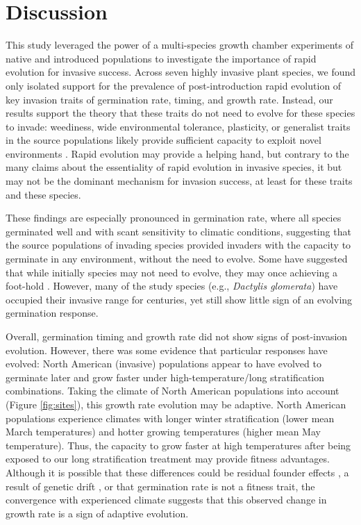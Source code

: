 \documentclass[12pt]{article}\usepackage[]{graphicx}\usepackage[]{color}
\begin{document}
	\section{Discussion}
	
	This study leveraged the power of a multi-species growth chamber experiments of native and introduced populations to investigate the importance of rapid evolution for invasive success. Across seven highly invasive plant species, we found only isolated support for the prevalence of post-introduction rapid evolution of key invasion traits of germination rate, timing, and growth rate. Instead, our results support the theory that these traits do not need to evolve for these species to invade: weediness, wide environmental tolerance, plasticity, or generalist traits in the source populations likely provide sufficient capacity to exploit novel environments \parencite{Baker1965}. Rapid evolution may provide a helping hand, but contrary to the many claims about the essentiality of rapid evolution in invasive species, it but may not be the dominant mechanism for invasion success, at least for these traits and these species. 
	
	These findings are  especially pronounced in germination rate, where all species germinated well and with scant sensitivity to climatic conditions, suggesting that the source populations of invading species provided invaders with the capacity to germinate in any environment, without the need to evolve. Some have suggested that while initially species may not need to evolve, they may once achieving a foot-hold \parencite{Lamarque2015}. However, many of the study species (e.g., \textit{Dactylis glomerata}) have occupied their invasive range for centuries, yet still show little sign of an evolving germination response. 
	
	Overall, germination timing and growth rate did not show signs of post-invasion evolution. However, there was some evidence that particular responses have evolved: North American (invasive) populations appear to have evolved to germinate later and grow faster under high-temperature/long stratification combinations. Taking the climate of North American populations into account (Figure \ref{fig:sites}), this growth rate evolution may be adaptive. North American populations experience climates with longer winter stratification  (lower mean March temperatures) and hotter growing temperatures (higher mean May temperature). Thus, the capacity to grow faster at high temperatures after being exposed to our long stratification treatment may provide fitness advantages. Although it is  possible that these differences could be residual founder effects \parencite{Shirk2014}, a result of genetic drift \parencite{Eckert1996}, or that germination rate is not a fitness trait,  the convergence with experienced climate suggests that this observed change in growth rate is a sign of adaptive evolution. 
	
\end{document}
